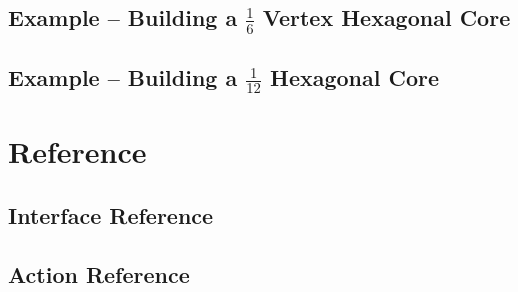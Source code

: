 \documentclass[letterpaper,10pt,draft]{book}
\begin{document}
\chapter{Example -- Building a $\frac{1}{6}$ Vertex Hexagonal Core}
\label{chapter:ExampleBuildingA6thVertexHexagonalCore}

\chapter{Example -- Building a $\frac{1}{12}$ Hexagonal Core}
\label{chapter:ExampleBuildingA12thHexagonalCore}

\part{Reference}
\chapter{Interface Reference}
\chapter{Action Reference}
\end{document}
